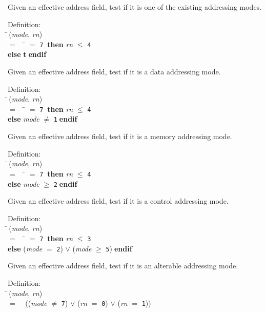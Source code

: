  Given an effective address field, test if it is one of the existing
 addressing modes.
\begin{tabbing}{\sc Definition}: \\  
\=\,({\it{mode\/}}, {\it{rn\/}}) \\ 
$=$$\;\;\;\;$\= $=$ {\tt{7}}$\;\;${\bf then }{\it{rn\/}} $\leq$ {\tt{4}} \\ 
{\bf else }{\bf{t}}$\;${\bf  endif}\-\-
\end{tabbing}
                   
 Given an effective address field, test if it is a data addressing mode.
\begin{tabbing}{\sc Definition}: \\  
\=\,({\it{mode\/}}, {\it{rn\/}}) \\ 
$=$$\;\;\;\;$\= $=$ {\tt{7}}$\;\;${\bf then }{\it{rn\/}} $\leq$ {\tt{4}} \\ 
{\bf else }{\it{mode\/}} $\not=$ {\tt{1}}$\;${\bf  endif}\-\-
\end{tabbing}

 Given an effective address field, test if it is a memory addressing mode.
\begin{tabbing}{\sc Definition}: \\  
\=\,({\it{mode\/}}, {\it{rn\/}}) \\ 
$=$$\;\;\;\;$\= $=$ {\tt{7}}$\;\;${\bf then }{\it{rn\/}} $\leq$ {\tt{4}} \\ 
{\bf else }{\it{mode\/}} $\geq$ {\tt{2}}$\;${\bf  endif}\-\-
\end{tabbing}

 Given an effective address field, test if it is a control addressing mode.
\begin{tabbing}{\sc Definition}: \\  
\=\,({\it{mode\/}}, {\it{rn\/}}) \\ 
$=$$\;\;\;\;$\= $=$ {\tt{7}}$\;\;${\bf then }{\it{rn\/}} $\leq$ {\tt{3}} \\ 
{\bf else }({\it{mode\/}} $=$ {\tt{2}}) $\vee$ ({\it{mode\/}} $\geq$ {\tt{5}})$\;${\bf  endif}\-\-
\end{tabbing}

 Given an effective address field, test if it is an alterable addressing mode.
\begin{tabbing}{\sc Definition}: \\  
\=\,({\it{mode\/}}, {\it{rn\/}}) \\ 
$=$$\;\;\;\;$(({\it{mode\/}} $\not=$ {\tt{7}}) $\vee$ ({\it{rn\/}} $=$ {\tt{0}}) $\vee$ ({\it{rn\/}} $=$ {\tt{1}}))\-
\end{tabbing}

